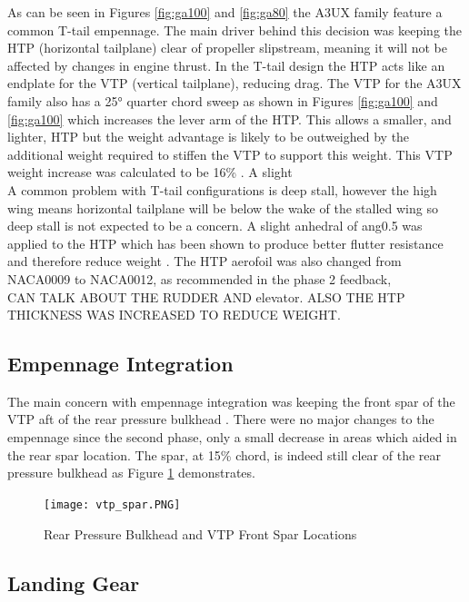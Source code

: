 \documentclass[11pt]{article}
\begin{document}
As can be seen in Figures \ref{fig:ga100} and \ref{fig:ga80} the A3UX family feature a common T-tail empennage. The main driver behind this decision was keeping the HTP (horizontal tailplane) clear of propeller slipstream, meaning it will not be affected by changes in engine thrust. In the T-tail design the HTP acts like an endplate for the VTP (vertical tailplane), reducing drag. The VTP for the A3UX family also has a \ang{25} quarter chord sweep as shown in Figures \ref{fig:ga100} and \ref{fig:ga100} which increases the lever arm of the HTP. This allows a smaller, and lighter, HTP but the weight advantage is likely to be outweighed by the additional weight required to stiffen the VTP to support this weight. This VTP weight increase was calculated to be 16\% \cite{tbeek}. A slight \\ 
A common problem with T-tail configurations is deep stall, however the high wing means horizontal tailplane will be below the wake of the stalled wing so deep stall is not expected to be a concern. A slight anhedral of ang{0.5} was applied to the HTP which has been shown to produce better flutter resistance and therefore reduce weight \cite{R3}. The HTP aerofoil was also changed from NACA0009 to NACA0012, as recommended in the phase 2 feedback, \\ CAN TALK ABOUT THE RUDDER AND elevator. ALSO THE HTP THICKNESS WAS INCREASED TO REDUCE WEIGHT.

\subsection{Empennage Integration}

The main concern with empennage integration was keeping the front spar of the VTP aft of the rear pressure bulkhead \cite{GAPP}. There were no major changes to the empennage since the second phase, only a small decrease in areas which aided in the rear spar location.	 The spar, at 15\% chord, is indeed still clear of the rear pressure bulkhead as Figure \ref{fig:vtpspar} demonstrates.

\FloatBarrier
\begin{figure}[h!]
\centering
\texttt{[image: vtp\_spar.PNG]}
\caption{Rear Pressure Bulkhead and VTP Front Spar Locations}
\label{fig:vtpspar}
\end{figure}
\FloatBarrier

\subsection{Landing Gear}
\end{document}
